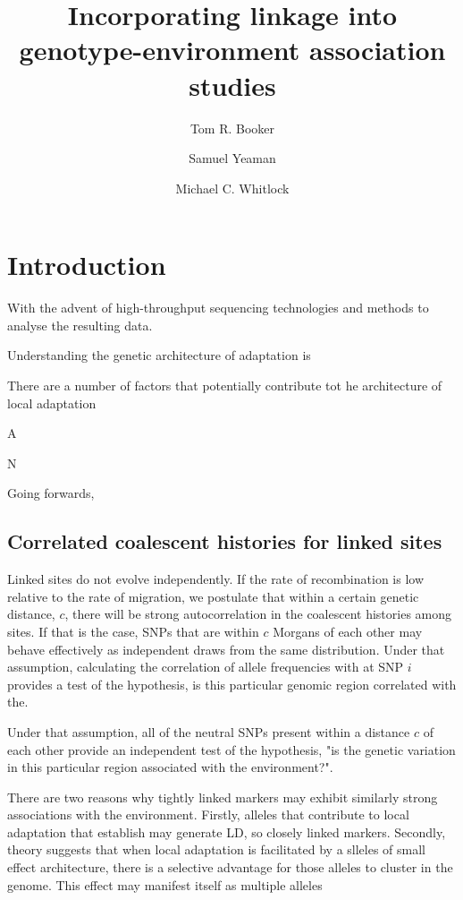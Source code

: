 \documentclass[11pt,twoside,lineno]{GSA_format}
\title{Incorporating linkage into genotype-environment association studies}
\author[$\ast$]{Tom R. Booker}
\author[$\dagger$]{Samuel Yeaman}
\author[$\ast$]{Michael C. Whitlock}
\affil[$\ast$]{University of British Columbia}
\affil[$\dagger$]{University of Calgary}
\begin{document}
\maketitle
\marginmark
\firstpagefootnote


\vspace{-33pt}%

\section{Introduction}

With the advent of high-throughput sequencing technologies and methods to analyse the resulting data.

Understanding the genetic architecture of adaptation is 

There are a number of factors that potentially contribute tot he architecture of local adaptation

A

N

Going forwards, 

\subsection{Correlated coalescent histories for linked sites}

Linked sites do not evolve independently. If the rate of recombination is low relative to the rate of migration, we postulate that within a certain genetic distance, $c$, there will be strong autocorrelation in the coalescent histories among sites. If that is the case, SNPs that are within $c$ Morgans of each other may behave effectively as independent draws from the same distribution. Under that assumption, calculating the correlation of allele frequencies with at SNP $i$ provides a test of the hypothesis, is this particular genomic region correlated with the.

Under that assumption, all of the neutral SNPs present within a distance $c$ of each other provide an independent test of the hypothesis, "is the genetic variation in this particular region associated with the environment?".

There are two reasons why tightly linked markers may exhibit similarly strong associations with the environment. Firstly, alleles that contribute to local adaptation that establish may generate LD, so closely linked markers. Secondly, theory suggests that when local adaptation is facilitated by a slleles of small effect architecture, there is a selective advantage for those alleles to cluster in the genome. This effect may manifest itself as multiple alleles 
\end{document}
